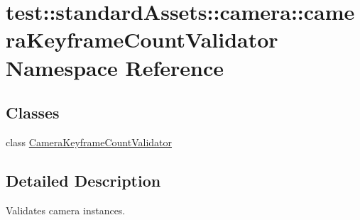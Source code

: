 \hypertarget{namespacetest_1_1standardAssets_1_1camera_1_1cameraKeyframeCountValidator}{\section{test\-:\-:standard\-Assets\-:\-:camera\-:\-:camera\-Keyframe\-Count\-Validator \-Namespace \-Reference}
\label{d3/d21/namespacetest_1_1standardAssets_1_1camera_1_1cameraKeyframeCountValidator}
}
\subsection*{\-Classes}
\begin{DoxyCompactItemize}
\item 
class \hyperlink{classtest_1_1standardAssets_1_1camera_1_1cameraKeyframeCountValidator_1_1CameraKeyframeCountValidator}{\-Camera\-Keyframe\-Count\-Validator}
\end{DoxyCompactItemize}


\subsection{\-Detailed \-Description}
\begin{DoxyVerb}
Validates camera instances.
\end{DoxyVerb}
 